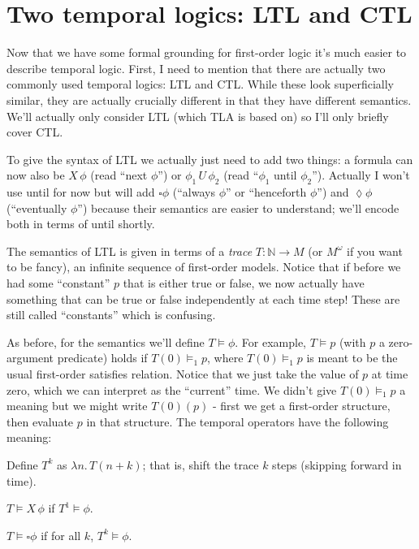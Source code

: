 \documentclass{scrbook}
\begin{document}
\section{Two temporal logics: LTL and CTL}

Now that we have some formal grounding for first-order logic it's much easier to
describe temporal logic. First, I need to mention that there are actually two
commonly used temporal logics: LTL and CTL. While these look superficially
similar, they are actually crucially different in that they have different
semantics. We'll actually only consider LTL (which TLA is based on) so I'll only
briefly cover CTL.

\newcommand{\next}{X\,}
\newcommand{\until}{\,U\,}
\newcommand{\always}{\square}
\newcommand{\eventually}{\lozenge}

To give the syntax of LTL we actually just need to add two things: a formula can
now also be $\next \phi$ (read ``next $\phi$'') or $\phi_1 \until \phi_{2}$
(read ``$\phi_1$ until $\phi_2$''). Actually I won't use until for now but will
add $\always \phi$ (``always $\phi$'' or ``henceforth $\phi$'') and
$\eventually \phi$ (``eventually $\phi$'') because their semantics are easier to
understand; we'll encode both in terms of until shortly.

The semantics of LTL is given in terms of a \emph{trace} $T : \mathbb{N} \to M$
(or $M^{\omega}$ if you want to be fancy), an infinite sequence of first-order
models. Notice that if before we had some ``constant'' $p$ that is either
true or false, we now actually have something that can be true or false
independently at each time step! These are still called ``constants'' which is
confusing.

As before, for the semantics we'll define $T \models \phi$. For example,
$T \models p$ (with $p$ a zero-argument predicate) holds if $T(0) \models_1 p$,
where $T(0) \models_{1} p$ is meant to be the usual first-order satisfies
relation. Notice that we just take the value of $p$ at time zero, which we can
interpret as the ``current'' time. We didn't give $T(0) \models_{1} p$ a meaning
but we might write $T(0)(p)$ - first we get a first-order structure, then
evaluate $p$ in that structure. The temporal operators have the following
meaning:

Define $T^{k}$ as $\lambda n.\, T(n + k)$; that is, shift the trace $k$ steps
(skipping forward in time).

$T \models \next \phi$ if $T^{1} \models \phi$.

$T \models \always \phi$ if for all $k$, $T^{k} \models \phi$.
\end{document}
